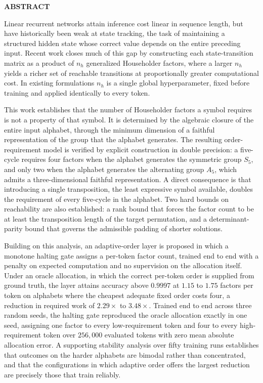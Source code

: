 \begin{center}
\textbf{{\Large ABSTRACT}}\\
\begin{center}
\justifying
Linear recurrent networks attain inference cost linear in sequence length, but have historically been weak at state tracking, the task of maintaining a structured hidden state whose correct value depends on the entire preceding input. Recent work closes much of this gap by constructing each state-transition matrix as a product of $n_h$ generalized Householder factors, where a larger $n_h$ yields a richer set of reachable transitions at proportionally greater computational cost. In existing formulations $n_h$ is a single global hyperparameter, fixed before training and applied identically to every token.

This work establishes that the number of Householder factors a symbol requires is not a property of that symbol. It is determined by the algebraic closure of the entire input alphabet, through the minimum dimension of a faithful representation of the group that the alphabet generates. The resulting order-requirement model is verified by explicit construction in double precision: a five-cycle requires four factors when the alphabet generates the symmetric group $S_5$, and only two when the alphabet generates the alternating group $A_5$, which admits a three-dimensional faithful representation. A direct consequence is that introducing a single transposition, the least expressive symbol available, doubles the requirement of every five-cycle in the alphabet. Two hard bounds on reachability are also established: a rank bound that forces the factor count to be at least the transposition length of the target permutation, and a determinant-parity bound that governs the admissible padding of shorter solutions.

Building on this analysis, an adaptive-order layer is proposed in which a monotone halting gate assigns a per-token factor count, trained end to end with a penalty on expected computation and no supervision on the allocation itself. Under an oracle allocation, in which the correct per-token order is supplied from ground truth, the layer attains accuracy above $0.9997$ at $1.15$ to $1.75$ factors per token on alphabets where the cheapest adequate fixed order costs four, a reduction in required work of $2.29\times$ to $3.48\times$. Trained end to end across three random seeds, the halting gate reproduced the oracle allocation exactly in one seed, assigning one factor to every low-requirement token and four to every high-requirement token over $256{,}000$ evaluated tokens with zero mean absolute allocation error. A supporting stability analysis over fifty training runs establishes that outcomes on the harder alphabets are bimodal rather than concentrated, and that the configurations in which adaptive order offers the largest reduction are precisely those that train reliably.
\end{center}
\end{center}
\\

